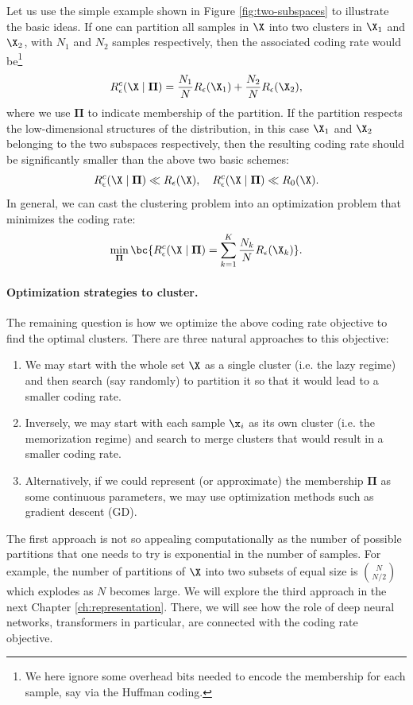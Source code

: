 \documentclass[../../book-main.tex]{subfiles}
\begin{document}
Let us use the simple example shown in Figure \ref{fig:two-subspaces} to illustrate the basic ideas. If one can partition all samples in $\X$ into two clusters in $\X_1$ and $\X_2$, with $N_1$ and $N_2$ samples respectively, then the associated coding rate would be\footnote{We here ignore some overhead bits needed to encode the membership for each sample, say via the Huffman coding.}
\begin{equation}
	R_{\epsilon}^c(\X\mid \boldsymbol{\Pi}) = \frac{N_1}{N}R_{\epsilon}(\X_1) + \frac{N_2}{N}R_{\epsilon}(\X_2),
\end{equation}
where we use $\boldsymbol{\Pi}$ to indicate membership of the partition. If the partition respects the low-dimensional structures of the distribution, in this case $\X_1$ and $\X_2$ belonging to the two subspaces respectively, then the resulting coding rate should be significantly smaller than the above two basic schemes:
\begin{equation}
	R_{\epsilon}^c(\X \mid \boldsymbol{\Pi}) \ll R_{\epsilon}(\X), \quad     R_{\epsilon}^c(\X \mid \boldsymbol{\Pi}) \ll R_0(\X).
\end{equation}
In general, we can cast the clustering problem into an optimization problem that minimizes the coding rate:
\begin{equation}
	\min_{\boldsymbol{\Pi}}  \bc{ R_{\epsilon}^c(\X \mid \boldsymbol{\Pi}) = \sum_{k=1}^K \frac{N_k}{N}R_{\epsilon}(\X_k)}.
\end{equation}

\paragraph{Optimization strategies to cluster.}
The remaining question is how we optimize the above coding rate objective to find the optimal clusters. There are three natural approaches to this objective:
\begin{enumerate}
	\item We may start with the whole set $\X$ as a single cluster (i.e. the lazy regime) and then search (say randomly) to partition it so that it would lead to a smaller coding rate.
	\item Inversely, we may start with each sample $\x_i$ as its own cluster (i.e. the memorization regime)  and search to merge clusters that would result in a smaller coding rate.
	\item Alternatively, if we could represent (or approximate) the membership $\boldsymbol{\Pi}$ as some continuous parameters, we may use optimization methods such as gradient descent (GD).
\end{enumerate}
The first approach is not so appealing computationally as the number of possible partitions that one needs to try is exponential in the number of samples. For example, the number of partitions of $\X$ into two subsets of equal size is $N \choose N/2$ which explodes as $N$ becomes large. We will explore the third approach in the next Chapter \ref{ch:representation}. There, we will see how the role of deep neural networks, transformers in particular, are connected with the coding rate objective.
\end{document}
